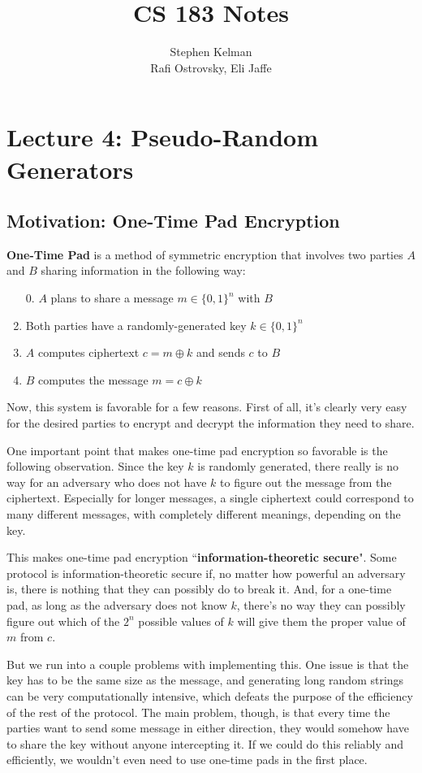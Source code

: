 \documentclass[11pt]{article}
\title{CS 183 Notes}
\author{Stephen Kelman\\ Rafi Ostrovsky, Eli Jaffe}
\begin{document}
\section{Lecture 4: Pseudo-Random Generators}



\subsection{Motivation: One-Time Pad Encryption}

\textbf{One-Time Pad} is a method of symmetric encryption that involves two parties \(A\) and \(B\) sharing information in the following way:
\begin{enumerate}
\item[ 0. ] \(A\) plans to share a message \(m\in\{0,1\}^n\) with \(B\) 
\item Both parties have a randomly-generated key \(k\in\{0,1\}^n\)
\item \(A\) computes ciphertext \(c=m\oplus k\) and sends \(c\) to \(B\)
\item \(B\) computes the message \(m=c\oplus k\)
\end{enumerate}

Now, this system is favorable for a few reasons. First of all, it's clearly very easy for the desired parties to encrypt and decrypt the information they need to share.\medskip

One important point that makes one-time pad encryption so favorable is the following observation. 
Since the key \(k\) is randomly generated, there really is no way for an adversary who does not have \(k\) to figure out the message from the ciphertext. 
Especially for longer messages, a single ciphertext could correspond to many different messages, with completely different meanings, depending on the key.\smallskip

This makes one-time pad encryption ``\textbf{information-theoretic secure}". 
Some protocol is information-theoretic secure if, no matter how powerful an adversary is, there is nothing that they can possibly do to break it. 
And, for a one-time pad, as long as the adversary does not know \(k\), there's no way they can possibly figure out which of the \(2^n\) possible values of \(k\) will give them the proper value of \(m\) from \(c\).\bigskip

But we run into a couple problems with implementing this. 
One issue is that the key has to be the same size as the message, and generating long random strings can be very computationally intensive, which defeats the purpose of the efficiency of the rest of the protocol.
The main problem, though, is that every time the parties want to send some message in either direction,
they would somehow have to share the key without anyone intercepting it. 
If we could do this reliably and efficiently, we wouldn't even need to use one-time pads in the first place. \bigskip
\end{document}
